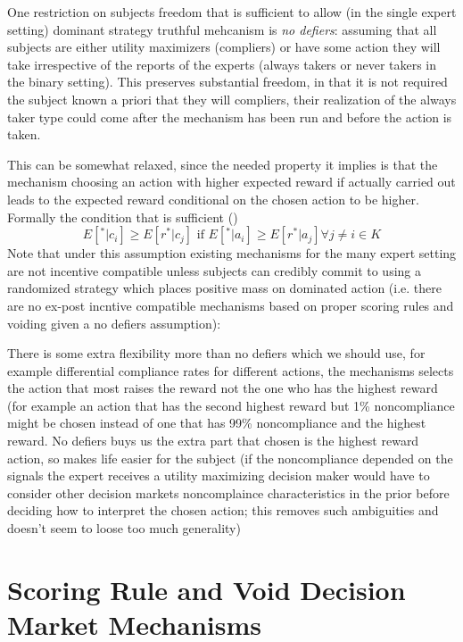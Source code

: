 One restriction on subjects freedom that is sufficient to allow (in the single expert setting) dominant strategy truthful mehcanism is \emph{no defiers}: assuming that all subjects are either utility maximizers (compliers) or have some action they will take irrespective of the reports of the experts (always takers or never takers in the binary setting).
This preserves substantial freedom, in that it is not required the subject known a priori that they will compliers, their realization of the always taker type could come after the mechanism has been run and before the action is taken. 

This can be somewhat relaxed, since the needed property it implies is that the mechanism choosing an action with higher expected reward if actually carried out leads to the expected reward conditional on the chosen action to be higher. Formally the condition that is sufficient ()
$$E[ ^{*}|c_i]  \geq E[ r^{*}|c_j] \text{ if }E[ ^{*}|a_i]  \geq E[ r^{*}|a_j]  \forall j \neq i \in K$$
Note that under this assumption existing mechanisms for the many expert setting are not incentive compatible unless subjects can credibly commit to using a randomized strategy which places positive mass on dominated action (i.e. there are no ex-post incntive compatible mechanisms based on proper scoring rules and voiding given a no defiers assumption):



There is some extra flexibility more than no defiers which we should use, for example differential compliance rates for different actions, the mechanisms selects the action that most raises the reward not the one who has the highest reward (for example an action that has the second highest reward but 1\% noncompliance might be chosen instead of one  that has 99\% noncompliance and the highest reward. No defiers buys us the extra part that chosen is the highest reward action, so makes life easier for the subject (if the noncompliance depended on the signals the expert receives a utility maximizing decision maker would have to consider other decision markets noncomplaince characteristics in the prior before deciding how to interpret the chosen action; this removes such ambiguities and doesn't seem to loose too much generality)



\section{Scoring Rule and Void Decision Market Mechanisms}

